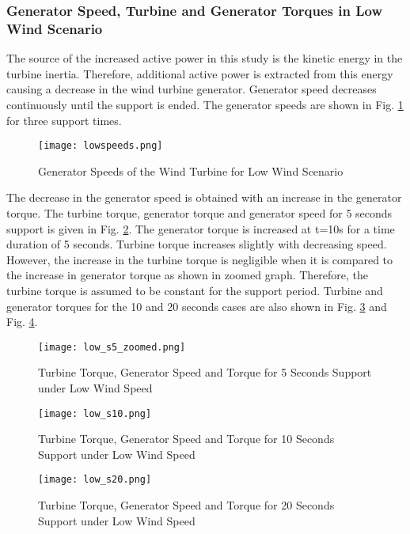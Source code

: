 \subsubsection{Generator Speed, Turbine and Generator Torques in Low Wind Scenario}
The source of the increased active power in this study is the kinetic energy in the turbine inertia. Therefore, additional active power is extracted from this energy causing a decrease in the wind turbine generator. Generator speed decreases continuously until the support is ended. The generator speeds are shown in Fig. \ref{low_speeds} for three support times.\par
\begin{figure}[h!]
	\centering
	\texttt{[image: lowspeeds.png]}
	\caption{Generator Speeds of the Wind Turbine for Low Wind Scenario}
	\label{low_speeds}
\end{figure}
The decrease in the generator speed is obtained with an increase in the generator torque. The turbine torque, generator torque and generator speed for 5 seconds support is given in Fig. \ref{low_torques}. The generator torque is increased at t=10s for a time duration of 5 seconds. Turbine torque increases slightly with decreasing speed. However, the increase in the turbine torque is negligible when it is compared to the increase in generator torque as shown in zoomed graph. Therefore, the turbine torque is assumed to be constant for the support period. Turbine and generator torques for the 10 and 20 seconds cases are also shown in Fig. \ref{low_torques2} and Fig. \ref{low_torques3}. 
\begin{figure}[h!]
	\centering
	\texttt{[image: low\_s5\_zoomed.png]}
	\caption{Turbine Torque, Generator Speed and Torque for 5 Seconds Support under Low Wind Speed}
	\label{low_torques}
\end{figure}

\begin{figure}[h!]
	\centering
	\texttt{[image: low\_s10.png]}
	\caption{Turbine Torque, Generator Speed and Torque for 10 Seconds Support under Low Wind Speed}
	\label{low_torques2}
\end{figure}

\begin{figure}[h!]
	\centering
	\texttt{[image: low\_s20.png]}
	\caption{Turbine Torque, Generator Speed and Torque for 20 Seconds Support under Low Wind Speed}
	\label{low_torques3}
\end{figure}
